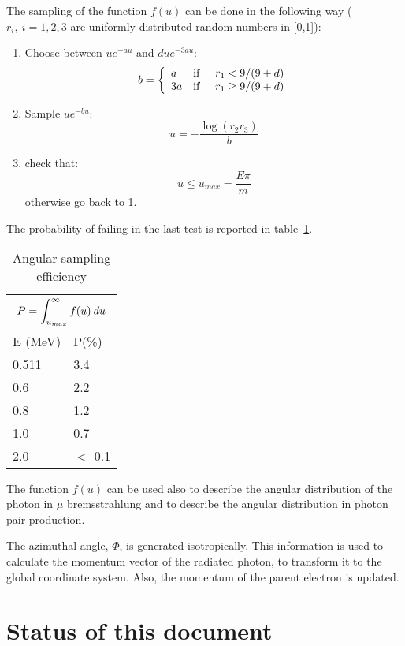 The sampling of the function $f(u)$ can be done in the following way
($r_{i},\: i=1,2,3$ are uniformly distributed random numbers
in [0,1]):
\begin{enumerate}
\item Choose between $u e^{-au}$ and $d u e^{-3au}$:
\[
b = \left \{ \begin{array}{ll}
a & \mbox{if\hspace{0.5cm}}r_{1} < 9/(9+d) \\
3a & \mbox{if\hspace{0.5cm}}r_{1} \geq 9/(9+d)
\end{array} \right .
\]
\item Sample $u e^{-bu}$:
\[
u=-\frac{\log ( r_{2} r_{3}) }{b}
\]
\item check that:
\[
u \leq u_{max} = \frac{E \pi}{m}
\]
otherwise go back to 1.
\end{enumerate}

The probability of failing in the last test is reported in
table~\ref{tb:phys341-1}.

\begin{table}
\begin{centering}
\begin{tabular}{|l|l|}
\multicolumn{2}{c}{$\displaystyle
P = \int^{\infty}_{u_{max}}{f(u) \: du} \hfill $} \\ [0.5cm]
\hline
E (MeV) & P(\%) \\ \hline
0.511 & 3.4 \\
0.6 &  2.2 \\
0.8 & 1.2 \\
1.0 & 0.7 \\
2.0 & $<$ 0.1 \\ \hline
\end{tabular}
\caption{Angular sampling efficiency}
\label{tb:phys341-1}
\end{centering}
\end{table}


The function $f(u)$ can be used also to describe
the angular distribution of the photon in $\mu$ bremsstrahlung and to
describe the angular distribution in photon pair production.

The azimuthal angle, $\Phi$, is generated isotropically.
This information is used to calculate the momentum vector of the radiated
photon, to transform it to the global  coordinate system. 
Also, the momentum of the parent electron is updated.

\section{Status of this document}

